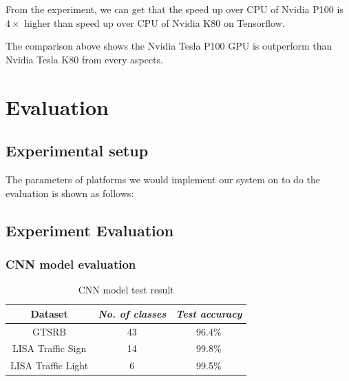 \documentclass[conference]{IEEEtran}
\begin{document}
From the experiment, we can get that the speed up over CPU of Nvidia P100 is $4 \times$ higher than speed up over CPU of Nvidia K80 on Tensorflow. 

The comparison above shows the Nvidia Tesla P100 GPU is outperform than Nvidia Tesla K80 from every aspects. 

\section{Evaluation}

\subsection{Experimental setup}

The parameters of platforms we would implement our system on to do the evaluation is shown as follows: 



\subsection{Experiment Evaluation}

\subsubsection{CNN model evaluation}

\begin{table}[H]
\caption{CNN model test result}
\begin{center}
\begin{tabular}{|c|c|c|}
\hline
\textbf{Dataset} & \textbf{\textit{No. of classes}}& \textbf{\textit{Test accuracy}} \\
\hline
GTSRB & 43 & 96.4\% \\
\hline
LISA Traffic Sign & 14 & 99.8\% \\
\hline
LISA Traffic Light& 6 & 99.5\% \\
\hline
\end{tabular}
\label{tab3}
\end{center}
\end{table}
\end{document}
